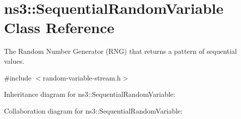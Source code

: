 \hypertarget{classns3_1_1SequentialRandomVariable}{}\section{ns3\+:\+:Sequential\+Random\+Variable Class Reference}
\label{classns3_1_1SequentialRandomVariable}


The Random Number Generator (R\+NG) that returns a pattern of sequential values.  




{\ttfamily \#include $<$random-\/variable-\/stream.\+h$>$}



Inheritance diagram for ns3\+:\+:Sequential\+Random\+Variable\+:


Collaboration diagram for ns3\+:\+:Sequential\+Random\+Variable\+:
